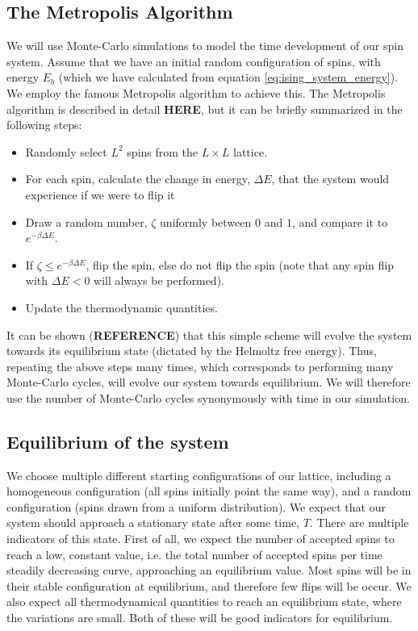 \documentclass[a4paper, 10pt]{article}
\begin{document}
\subsection{The Metropolis Algorithm}\label{Monte-Carlo_algo}
We will use Monte-Carlo simulations to model the time development of our spin system. Assume that we have an initial random configuration of spins, with energy $E_b$ (which we have calculated from equation \ref{eq:ising_system_energy}). We employ the famous Metropolis algorithm to achieve this. The Metropolis algorithm is described in detail \textbf{HERE}, but it can be briefly summarized in the following steps:
\begin{itemize}
\item Randomly select $L^2$ spins from the $L\times L$ lattice.
\item For each spin, calculate the change in energy, $\Delta E$, that the system would experience if we were to flip it
\item Draw a random number, $\zeta$ uniformly between $0$ and $1$, and compare it to $e^{-\beta \Delta E}$. \item If $\zeta \leq e^{-\beta \Delta E}$, flip the spin, else do not flip the spin (note that any spin flip with $\Delta E < 0$ will always be performed).
\item Update the thermodynamic quantities.
\end{itemize}
It can be shown (\textbf{REFERENCE}) that this simple scheme will evolve the system towards its equilibrium state (dictated by the Helmoltz free energy). Thus, repeating the above steps many times, which corresponds to performing many Monte-Carlo cycles, will evolve our system towards equilibrium. We will therefore use the number of Monte-Carlo cycles synonymously with time in our simulation.
\subsection{Equilibrium of the system}\label{equilibrium_system}
We choose multiple different starting configurations of our lattice, including a homogeneous configuration (all spins initially point the same way), and a random configuration (spins drawn from a uniform distribution). We expect that our system should approach a stationary state after some time, $T$. There are multiple indicators of this state. First of all, we expect the number of accepted spins to reach a low, constant value, i.e. the total number of accepted spins  per time steadily decreasing curve, approaching an equilibrium value. Most spins will be in their stable configuration at equilibrium, and therefore few flips will be occur. We also expect all thermodynamical quantities to reach an equilibrium state, where the variations are small. Both of these will be good indicators for equilibrium. 
\end{document}
